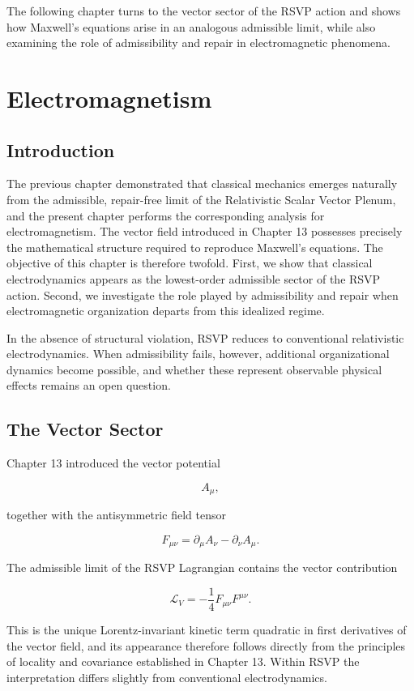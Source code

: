 \documentclass[11pt,oneside]{book}
\numberwithin{equation}{chapter}
\theoremstyle{definition}
\theoremstyle{plain}
\begin{document}
The following chapter turns to the vector sector of the RSVP action and shows how Maxwell's equations arise in an analogous admissible limit, while also examining the role of admissibility and repair in electromagnetic phenomena.

\chapter{Electromagnetism}

\section{Introduction}

The previous chapter demonstrated that classical mechanics emerges naturally from the admissible, repair-free limit of the Relativistic Scalar Vector Plenum, and the present chapter performs the corresponding analysis for electromagnetism. The vector field introduced in Chapter 13 possesses precisely the mathematical structure required to reproduce Maxwell's equations. The objective of this chapter is therefore twofold. First, we show that classical electrodynamics appears as the lowest-order admissible sector of the RSVP action. Second, we investigate the role played by admissibility and repair when electromagnetic organization departs from this idealized regime.

In the absence of structural violation, RSVP reduces to conventional relativistic electrodynamics. When admissibility fails, however, additional organizational dynamics become possible, and whether these represent observable physical effects remains an open question.

\section{The Vector Sector}

Chapter 13 introduced the vector potential

\[
A_\mu,
\]

together with the antisymmetric field tensor

\[
F_{\mu\nu}
=
\partial_\mu A_\nu
-
\partial_\nu A_\mu.
\]

The admissible limit of the RSVP Lagrangian contains the vector contribution

\[
\boxed{
\mathcal L_V
=
-\frac14
F_{\mu\nu}F^{\mu\nu}.
}
\]

This is the unique Lorentz-invariant kinetic term quadratic in first derivatives of the vector field, and its appearance therefore follows directly from the principles of locality and covariance established in Chapter 13. Within RSVP the interpretation differs slightly from conventional electrodynamics.
\end{document}
